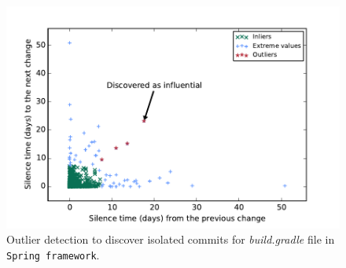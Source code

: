 \begin{figure}[t!]
\centering
\includegraphics[width=0.8\linewidth]{fig/build-gradle.pdf}
\caption{Outlier detection to discover isolated commits for {\em build.gradle} file in {\tt Spring framework}.}
\label{fig:build-gradle}
\end{figure}


%




